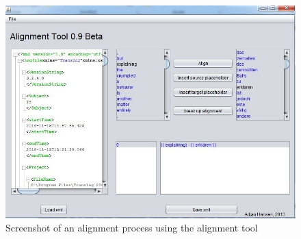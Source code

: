\documentclass[output=paper]{LSP/langsci}
\begin{document}
\begin{figure}
\includegraphics[width=.7\textwidth]{./figures/2-1.jpg}
\caption{Screenshot of an alignment process using the alignment tool}
\end{figure}
\end{document}
